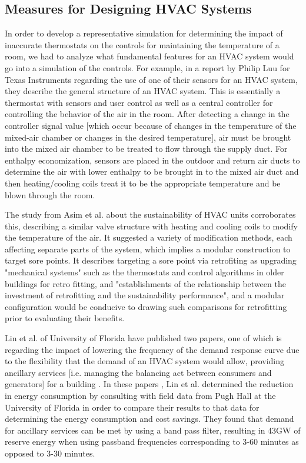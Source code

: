 \documentclass[conference,letterpaper]{IEEEtran}
\begin{document}
\subsection{Measures for Designing HVAC Systems}
In order to develop a representative simulation for determining the impact of inaccurate thermostats on the controls for maintaining the temperature of a room, we had to analyze what fundamental features for an HVAC system would go into a simulation of the controls. For example, in a report by Philip Luu for Texas Instruments \cite{Luu2021} regarding the use of one of their sensors for an HVAC system, they describe the general structure of an HVAC system. This is essentially a thermostat with sensors and user control as well as a central controller for controlling the behavior of the air in the room. After detecting a change in the controller signal value [which occur because of changes in the temperature of the mixed-air chamber or changes in the desired temperature], air must be brought into the mixed air chamber to be treated to flow through the supply duct. For enthalpy economization, sensors are placed in the outdoor and return air ducts to determine the air with lower enthalpy to be brought in to the mixed air duct and then heating/cooling coils treat it to be the appropriate temperature and be blown through the room. 

The study from Asim et al. about the sustainability of HVAC units \cite{ijerph19021016} corroborates this, describing a similar valve structure with heating and cooling coils to modify the temperature of the air. It suggested a variety of modification methods, each affecting separate parts of the system, which implies a modular construction to target sore points. It describes targeting a sore point via retrofiting as upgrading "mechanical systems" such as the thermostats and control algorithms in older buildings for retro fitting, and "establishments of the relationship between the investment of retrofitting and the sustainability performance", and a modular configuration would be conducive to drawing such comparisons for retrofitting prior to evaluating their benefits.

Lin et al. of University of Florida have published two papers, one of which is regarding the impact of lowering the frequency of the demand response curve due to the flexibility that the demand of an HVAC system would allow, providing ancillary services [i.e. managing the balancing act between consumers and generators] for a building \cite{6687952}. In these papers \cite{6687952, 7171796}, Lin et al. determined the reduction in energy consumption by consulting with field data from Pugh Hall at the University of Florida in order to compare their results to that data for determining the energy consumption and cost savings. They found that demand for ancillary services can be met by using a band pass filter, resulting in 43GW of reserve energy when using passband frequencies corresponding to 3-60 minutes as opposed to 3-30 minutes. 
\end{document}
